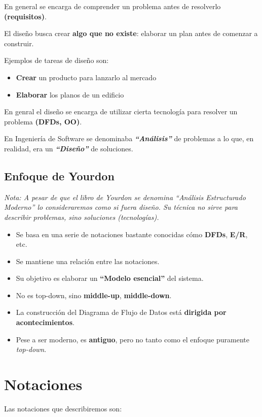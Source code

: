 En general se encarga de comprender un problema antes de resolverlo \textbf{(requisitos)}.

El diseño busca crear \textbf{algo que no existe}: elaborar un plan antes de comenzar a construir.

Ejemplos de tareas de diseño son:

\begin{itemize}[noitemsep]
\item \textbf{Crear} un producto para lanzarlo al mercado
\item \textbf{Elaborar} los planos de un edificio
\end{itemize}

En genral el diseño se encarga de utilizar cierta tecnología para resolver un problema \textbf{(DFDs, OO)}.

En Ingeniería de Software se denominaba \textit{\textbf{``Análisis''}} de problemas a lo que, en realidad, era un \textit{\textbf{``Diseño''}} de soluciones.

\subsection{Enfoque de Yourdon}
\textit{Nota: A pesar de que el libro de Yourdon se denomina ``Análisis Estructurado Moderno'' lo consideraremos como si fuera diseño. Su técnica no sirve para describir problemas, sino soluciones (tecnologías).}

\begin{itemize}[noitemsep]
\item Se basa en una serie de notaciones bastante conocidas cómo \textbf{DFDs}, \textbf{E/R}, etc.
\item Se mantiene una relación entre las notaciones.
\item Su objetivo es elaborar un \textbf{``Modelo esencial''} del sistema.
\item No es top-down, sino \textbf{middle-up}, \textbf{middle-down}.
\item La construcción del Diagrama de Flujo de Datos está \textbf{dirigida por acontecimientos}.
\item Pese a ser moderno, es \textbf{antiguo}, pero no tanto como el enfoque puramente \textit{top-down}.
\end{itemize}

\section{Notaciones}
Las notaciones que describiremos son:

